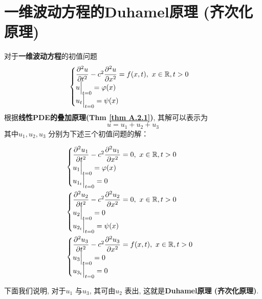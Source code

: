 \newpage

\section{一维波动方程的Duhamel原理 (齐次化原理)}
	对于\textbf{一维波动方程}的初值问题
	\begin{align*}
		\begin{cases}
			\dfrac{\partial^2 u}{\partial t^2} - c^2 \dfrac{\partial^2 u}{\partial x^2} = f(x , t) , \,\, x \in \mathbb{R} , t > 0 \\
			u \Big|_{t = 0} = \varphi(x) \\
			u_t \Big|_{t = 0} = \psi(x)
		\end{cases}
	\end{align*}
	根据\textbf{线性PDE的叠加原理(Thm \ref{thm A.2.1})}, 其解可以表示为
	\[ u = u_1 + u_2 + u_3 \]
	其中$u_1 , u_2 , u_3$ 分别为下述三个初值问题的解：
	
	\vspace*{1em}
	
	\begin{align}
		&\begin{cases}
			\dfrac{\partial^2 u_1}{\partial t^2} - c^2 \dfrac{\partial^2 u_1}{\partial x^2} = 0 , \,\, x \in \mathbb{R} , t > 0 \\
			u_1 \Big|_{t = 0} = \varphi(x) \\
			u_{1_t} \Big|_{t = 0} = 0
		\end{cases} \\ 
		&\begin{cases}
			\dfrac{\partial^2 u_2}{\partial t^2} - c^2 \dfrac{\partial^2 u_2}{\partial x^2} = 0 , \,\, x \in \mathbb{R} , t > 0 \\
			u_2 \Big|_{t = 0} = 0 \\
			u_{2_t} \Big|_{t = 0} = \psi(x)
		\end{cases}\label{A.2} \\
		&\begin{cases}
			\dfrac{\partial^2 u_3}{\partial t^2} - c^2 \dfrac{\partial^2 u_3}{\partial x^2} = f(x , t) , \,\, x \in \mathbb{R} , t > 0 \\
			u_3 \Big|_{t = 0} = 0 \\
			u_{3_t} \Big|_{t = 0} = 0
		\end{cases}
	\end{align}
	
	\vspace*{4em}
	
	下面我们说明, 对于$u_1$ 与$u_3$, 其可由$u_2$ 表出, 这就是\textbf{Duhamel原理 (齐次化原理)}. 
	
